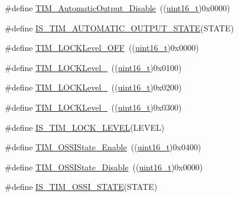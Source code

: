 \begin{DoxyCompactItemize}
\item 
\#define \hyperlink{group___t_i_m___a_o_e___bit___set___reset_ga0f80ba4fbadd434bc82ca63e904ace41}{T\+I\+M\+\_\+\+Automatic\+Output\+\_\+\+Disable}~((\hyperlink{_p_e___types_8h_a1f1825b69244eb3ad2c7165ddc99c956}{uint16\+\_\+t})0x0000)
\item 
\#define \hyperlink{group___t_i_m___a_o_e___bit___set___reset_gaabce6b8865d80929bf69c6c3c7780846}{I\+S\+\_\+\+T\+I\+M\+\_\+\+A\+U\+T\+O\+M\+A\+T\+I\+C\+\_\+\+O\+U\+T\+P\+U\+T\+\_\+\+S\+T\+A\+TE}(S\+T\+A\+TE)
\item 
\#define \hyperlink{group___lock__level_ga84d318c62d3e5dfe7082610d03e11f2f}{T\+I\+M\+\_\+\+L\+O\+C\+K\+Level\+\_\+\+O\+FF}~((\hyperlink{_p_e___types_8h_a1f1825b69244eb3ad2c7165ddc99c956}{uint16\+\_\+t})0x0000)
\item 
\#define \hyperlink{group___lock__level_ga7e4326fc7756ebf5e9eb9776c2734aea}{T\+I\+M\+\_\+\+L\+O\+C\+K\+Level\+\_}~((\hyperlink{_p_e___types_8h_a1f1825b69244eb3ad2c7165ddc99c956}{uint16\+\_\+t})0x0100)
\item 
\#define \hyperlink{group___lock__level_ga91bdf218f766e6a10b7a7df407250d25}{T\+I\+M\+\_\+\+L\+O\+C\+K\+Level\+\_}~((\hyperlink{_p_e___types_8h_a1f1825b69244eb3ad2c7165ddc99c956}{uint16\+\_\+t})0x0200)
\item 
\#define \hyperlink{group___lock__level_gaa0a0c1ffd9dc582d6571780c1747920b}{T\+I\+M\+\_\+\+L\+O\+C\+K\+Level\+\_}~((\hyperlink{_p_e___types_8h_a1f1825b69244eb3ad2c7165ddc99c956}{uint16\+\_\+t})0x0300)
\item 
\#define \hyperlink{group___lock__level_gacf5e70717f6d13af301331bb043f5d48}{I\+S\+\_\+\+T\+I\+M\+\_\+\+L\+O\+C\+K\+\_\+\+L\+E\+V\+EL}(L\+E\+V\+EL)
\item 
\#define \hyperlink{group___o_s_s_i___off___state___selection__for___idle__mode__state_gaf643ec0d2edb6c8fb725d00210b3d071}{T\+I\+M\+\_\+\+O\+S\+S\+I\+State\+\_\+\+Enable}~((\hyperlink{_p_e___types_8h_a1f1825b69244eb3ad2c7165ddc99c956}{uint16\+\_\+t})0x0400)
\item 
\#define \hyperlink{group___o_s_s_i___off___state___selection__for___idle__mode__state_gae1962736fd5cad82e97a5814ef6758bd}{T\+I\+M\+\_\+\+O\+S\+S\+I\+State\+\_\+\+Disable}~((\hyperlink{_p_e___types_8h_a1f1825b69244eb3ad2c7165ddc99c956}{uint16\+\_\+t})0x0000)
\item 
\#define \hyperlink{group___o_s_s_i___off___state___selection__for___idle__mode__state_gad24fc8836152903b408239284cecfab1}{I\+S\+\_\+\+T\+I\+M\+\_\+\+O\+S\+S\+I\+\_\+\+S\+T\+A\+TE}(S\+T\+A\+TE)
\item 

\end{DoxyCompactItemize}
